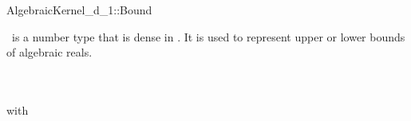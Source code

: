 \begin{ccRefConcept}{AlgebraicKernel_d_1::Bound}

\ccDefinition

\ccRefName\ is a number type that is dense in \R. 
It is  used to represent upper or lower bounds of algebraic reals. 

\ccRefines
{}\\
\\
 with \\


\end{ccRefConcept}